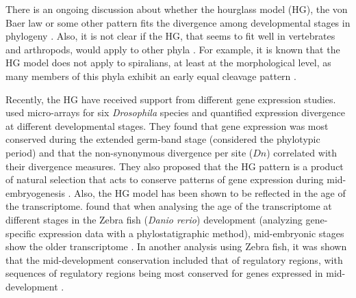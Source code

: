 There is an ongoing discussion about whether the hourglass model (HG), the von Baer law
or some other pattern fits the divergence among developmental stages in phylogeny \citep{Richardson1997,Poe2004,Kalinka2012}.
%
Also, it is not clear if the HG, that seems to fit well in vertebrates and arthropods, would apply to other phyla \citep{Raff1996,Salazar-Ciudad2010}. For example, it is known that the HG model does not apply to spiralians, at least at the morphological level, as many members of this phyla exhibit an early equal cleavage pattern \citep{Henry2002}.

Recently, the HG have received support from different gene expression studies.
\citet{Kalinka2010} used micro-arrays for six \textit{Drosophila} species and quantified expression divergence at different developmental stages. They found that gene expression was most conserved during the extended germ-band stage (considered the phylotypic period) and that the non-synonymous divergence per site ($Dn$) correlated with their divergence measures.
%
They also proposed that the HG pattern is a product of natural selection that acts to conserve patterns of gene expression during mid-embryogenesis \citep{Kalinka2010}.
%
Also, the HG model has been shown to be reflected in the age of the transcriptome. \citet{Domazet-Loso2010} found that when analysing the age of the transcriptome at different stages in the Zebra fish (\textit{Danio rerio}) development (analyzing gene-specific expression data with a phylostatigraphic method), mid-embryonic stages show the older transcriptome \citep{Domazet-Loso2010}.
%
%
In another analysis using Zebra fish, it was shown that the mid-development conservation included that of regulatory regions, with sequences of regulatory regions being most conserved for genes expressed in mid-development \citep{Piasecka2013}.

